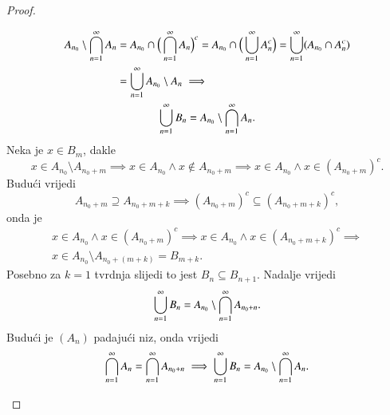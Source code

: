 \begin{proof}
\begin{enumerate}[label={(\roman*)}]
\begin{equation*}
            \begin{gathered}
                \begin{aligned}
                    A_{n_0} \setminus \bigcap\limits_{n=1}^{\infty} A_n &= A_{n_0} \cap \Big( \bigcap\limits_{n=1}^{\infty} A_n \Big)^c = A_{n_0} \cap \Big( \bigcup\limits_{n = 1}^{\infty} A_n^c \Big) = \bigcup\limits_{n = 1}^{\infty} (A_{n_0} \cap A_n^c)\\
                    &= \bigcup\limits_{n = 1}^{\infty} A_{n_0} \setminus A_n \implies
                \end{aligned}\\
                \bigcup\limits_{n=1}^{\infty} B_n = A_{n_0} \setminus \bigcap\limits_{n=1}^{\infty} A_n.
            \end{gathered}
        \end{equation*}
            Neka je $x \in B_m$, dakle
            \begin{equation*}
                    x \in A_{n_0} \setminus A_{n_0+m} \implies x \in A_{n_0}
                    \land x \notin A_{n_0+m} \implies x \in A_{n_0} \land x \in (A_{n_0+m})^c.
            \end{equation*}
            Budu\' ci vrijedi
            \begin{equation*}
                A_{n_0+m} \supseteq A_{n_0+m+k} \implies (A_{n_0+m})^c
            \subseteq (A_{n_0+m+k})^c,
            \end{equation*}
            onda je
            \begin{equation*}
                \begin{gathered}
                    x \in A_{n_0} \land x \in (A_{n_0+m})^c \implies x \in A_{n_0} \land x \in (A_{n_0+m+k})^c \implies\\
                    x \in A_{n_0} \setminus A_{n_0+(m+k)} = B_{m+k}.
                \end{gathered}
            \end{equation*}
            Posebno za $k=1$ tvrdnja slijedi to jest $B_n \subseteq B_{n+1}$.
            Nadalje vrijedi
            \begin{equation*}
                \bigcup\limits_{n=1}^{\infty}
            B_n = A_{n_0} \setminus \bigcap\limits_{n=1}^{\infty} A_{n_0+n}.
            \end{equation*}
            Budu\' ci je $(A_n)$ padaju\' ci niz, onda vrijedi
            \begin{equation*}
                \presjek{n=1}{\infty} A_n = \presjek{n=1}{\infty} A_{n_0+n} \implies \unija{n=1}{\infty} B_n = A_{n_0} \setminus \presjek{n=1}{\infty} A_n.

\end{equation*}
\end{enumerate}
\end{proof}
